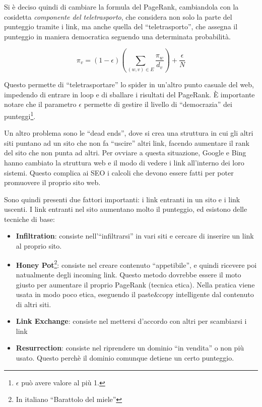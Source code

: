 Si \`e deciso quindi di cambiare la formula del PageRank, cambiandola con la cosidetta \textit{componente del teletrasporto}, che considera non solo la parte del punteggio tramite i link, ma anche quella del ``teletrasporto'', che assegna il punteggio in maniera democratica seguendo una determinata probabilit\`a.

\[ \pi_v = (1- \epsilon) ( \sum_{(w,v) \in E}\frac{\pi_w}{d_v}) + \frac{\epsilon}{N} \]

Questo permette di ``teletrasportare'' lo spider in un'altro punto casuale del web, impedendo di entrare in loop e di sballare i risultati del PageRank. \`E importante notare che il parametro $ \epsilon $ permette di gestire il livello di ``democrazia'' dei punteggi\footnote{$\epsilon$ pu\`o avere valore al pi\`u 1.}. 



Un altro problema sono le ``dead ends'', dove si crea una struttura in cui gli altri siti puntano ad un sito che non fa ``uscire'' altri link, facendo aumentare il rank del sito che non punta ad altri. Per ovviare a questa situazione, Google e Bing hanno cambiato la struttura web e il modo di vedere i link all'interno dei loro sistemi. Questo complica ai SEO i calcoli che devono essere fatti per poter promuovere il proprio sito web.


Sono quindi presenti due fattori importanti: i link entranti in un sito e i link uscenti. I link entranti nel sito aumentano molto il punteggio, ed esistono delle tecniche di base:
\begin{itemize}

\item \textbf{Infiltration}: consiste nell'``infiltrarsi'' in vari siti e cercare di inserire un link al proprio sito.
\item \textbf{Honey Pot}\footnote{In italiano ``Barattolo del miele''}: consiste nel creare contenuto ``appetibile'', e quindi ricevere poi natualmente degli incoming link. Questo metodo dovrebbe essere il moto giusto per aumentare il proprio PageRank (tecnica etica). Nella pratica viene usata in modo poco etica, eseguendo il paste\&copy intelligente dal contenuto di altri siti.
\item \textbf{Link Exchange}: consiste nel mettersi d'accordo con altri per scambiarsi i link
\item \textbf{Resurrection}: consiste nel riprendere un dominio ``in vendita'' o non pi\`u usato. Questo perch\`e il dominio comunque detiene un certo punteggio.

\end{itemize}

